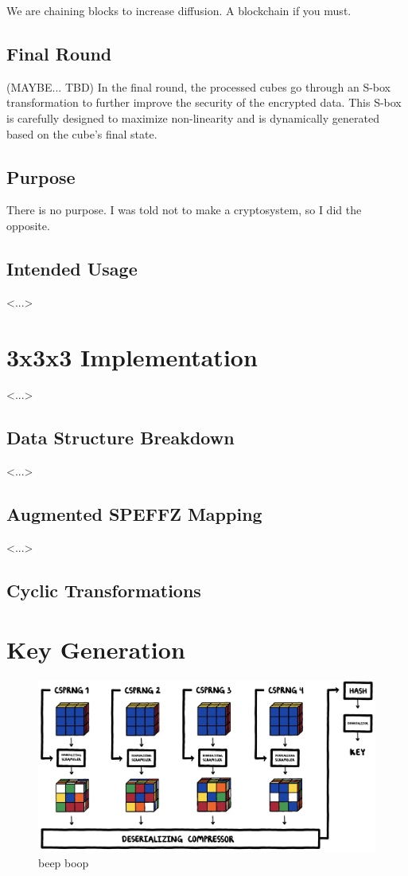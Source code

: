 \documentclass[12pt]{article}
\begin{document}
We are chaining blocks to increase diffusion. A blockchain if you must.
\subsection{Final Round}

(MAYBE... TBD) In the final round, the processed cubes go through an S-box transformation to further improve the security of the encrypted data. This S-box is carefully designed to maximize non-linearity and is dynamically generated based on the cube's final state.

\subsection{Purpose}
There is no purpose. I was told not to make a cryptosystem, so I did the opposite.

\subsection{Intended Usage}
<...>

\section{3x3x3 Implementation}
<...>

\subsection{Data Structure Breakdown}
<...>

\subsection{Augmented SPEFFZ Mapping}
<...>

\subsection{Cyclic Transformations}

\section{Key Generation}

\begin{figure}[H]
    \centering
    \includegraphics[width=\textwidth]{key_gen/keygen.jpg}
    \caption{beep boop}
\end{figure}
\end{document}
